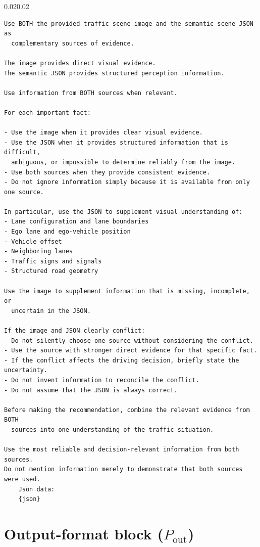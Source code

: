 \documentclass[12pt,a4paper]{report}
\begin{document}
\begin{adjustwidth}{0.02\linewidth}{0.02\linewidth}
\begin{framed}
\footnotesize
\begin{verbatim}
Use BOTH the provided traffic scene image and the semantic scene JSON as
  complementary sources of evidence.

The image provides direct visual evidence.
The semantic JSON provides structured perception information.

Use information from BOTH sources when relevant.

For each important fact:

- Use the image when it provides clear visual evidence.
- Use the JSON when it provides structured information that is difficult,
  ambiguous, or impossible to determine reliably from the image.
- Use both sources when they provide consistent evidence.
- Do not ignore information simply because it is available from only one source.

In particular, use the JSON to supplement visual understanding of:
- Lane configuration and lane boundaries
- Ego lane and ego-vehicle position
- Vehicle offset
- Neighboring lanes
- Traffic signs and signals
- Structured road geometry

Use the image to supplement information that is missing, incomplete, or
  uncertain in the JSON.

If the image and JSON clearly conflict:
- Do not silently choose one source without considering the conflict.
- Use the source with stronger direct evidence for that specific fact.
- If the conflict affects the driving decision, briefly state the uncertainty.
- Do not invent information to reconcile the conflict.
- Do not assume that the JSON is always correct.

Before making the recommendation, combine the relevant evidence from BOTH
  sources into one understanding of the traffic situation.

Use the most reliable and decision-relevant information from both sources.
Do not mention information merely to demonstrate that both sources were used.
    Json data:
    {json}
\end{verbatim}
\end{framed}
\end{adjustwidth}

\section{Output-format block (\texorpdfstring{$P_{\mathrm{out}}$}{P_out})}
\end{document}
